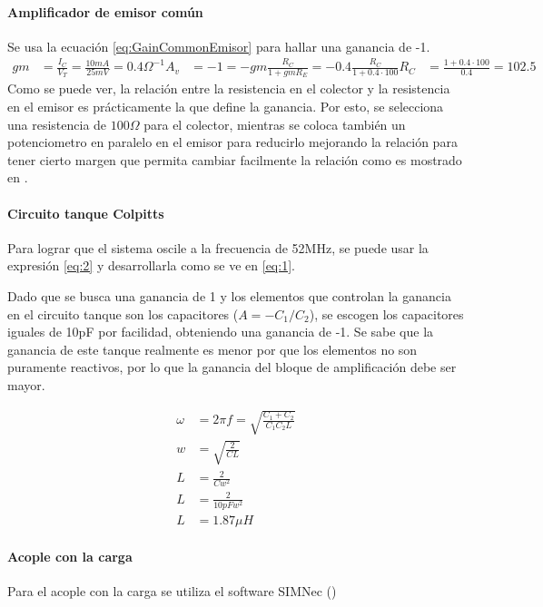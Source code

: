 \paragraph{Amplificador de emisor común}
Se usa la ecuación \ref{eq:GainCommonEmisor} para hallar una ganancia de -1. 
\begin{align*}
    gm&=\frac{I_C}{V_T}=\frac{10mA}{25mV}=0.4\Omega^{-1}
    A_v&=-1=-gm\frac{R_C}{1+gmR_E}=-0.4\frac{R_C}{1+0.4\cdot100}
    R_C&=\frac{1+0.4\cdot 100}{0.4}=102.5
\end{align*}
Como se puede ver, la relación entre la resistencia en el colector y la resistencia en el emisor es prácticamente la que define la ganancia. Por esto, se selecciona una resistencia de $100\Omega$ para el colector, mientras se coloca también un potenciometro en paralelo en el emisor para reducirlo mejorando la relación para tener cierto margen que permita cambiar facilmente la relación como es mostrado en \cite{aaron_danner_colpitts_2023}.  

\paragraph{Circuito tanque Colpitts}
Para lograr que el sistema oscile a la frecuencia de 52MHz, se puede usar la expresión \ref{eq:2} y desarrollarla como se ve en \ref{eq:1}. 

Dado que se busca una ganancia de 1 y los elementos que controlan la ganancia en el circuito tanque son los capacitores ($A=-C_1/C_2$), se escogen los capacitores iguales de 10pF por facilidad, obteniendo una ganancia de -1. Se sabe que la ganancia de este tanque realmente es menor por que los elementos no son puramente reactivos, por lo que la ganancia del bloque de amplificación debe ser mayor.  


\begin{align}
    \label{eq:1}
    \omega &= 2\pi f = \sqrt{\frac{C_1+C_2}{C_1C_2L}} \\
    w &= \sqrt{\frac{2}{CL}} \\
    L &= \frac{2}{C w^2} \\
    L &= \frac{2}{10pF w^2} \\
    L &= 1.87 \mu H
\end{align}

\paragraph{Acople con la carga}
Para el acople con la carga se utiliza el software SIMNec (\cite{SIMNec})


